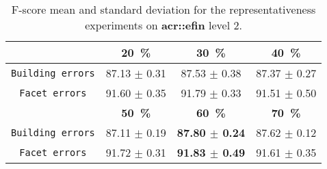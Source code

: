         \begin{table}[htbp]
            \footnotesize
            \centering
            \begin{tabular}{c c c c}
                \toprule
                & \textbf{\SI{20}{\percent}} & \textbf{\SI{30}{\percent}} & \textbf{\SI{40}{\percent}} \\
                \midrule
                \texttt{Building errors} & 87.13 $\pm$ 0.31 & 87.53 $\pm$ 0.38 & 87.37 $\pm$ 0.27 \\
                \midrule
                \texttt{Facet errors} & 91.60 $\pm$ 0.35 & 91.79 $\pm$ 0.33 & 91.51 $\pm$ 0.50 \\
                \bottomrule
                \toprule
                & \textbf{\SI{50}{\percent}} & \textbf{\SI{60}{\percent}} & \textbf{\SI{70}{\percent}} \\
                \midrule
                \texttt{Building errors} & 87.11 $\pm$ 0.19 & \textbf{87.80 $\pm$ 0.24} & 87.62 $\pm$ 0.12 \\
                \midrule
                \texttt{Facet errors} & 91.72 $\pm$ 0.31 & \textbf{91.83 $\pm$ 0.49} & 91.61 $\pm$ 0.35 \\
                \bottomrule
            \end{tabular}
            \caption{\label{tab::f_score_representativeness_f2} F-score mean and standard deviation for the representativeness experiments on \textbf{\gls{acr::efin}} level 2.}
        \end{table}
    
        \FloatBarrier

